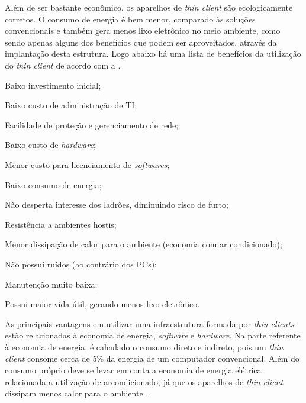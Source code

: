\documentclass[
	12pt,				%
	openright,			%
	twoside,			%
	a4paper,			%
	chapter=TITLE,		%
	english,			%
	brazil				%
	]{abntex2}
\begin{document}
Além de ser bastante econômico, os aparelhos de \textit{thin client} são ecologicamente corretos. O consumo de energia é bem menor, comparado às soluções convencionais e também gera menos lixo eletrônico no meio ambiente, como sendo apenas alguns dos benefícios que podem ser aproveitados, através da implantação desta estrutura. Logo abaixo há uma lista de benefícios da utilização do \textit{thin client} de acordo com a .

\begin{alineas}
\item Baixo investimento inicial;
\item Baixo custo de administração de TI;
\item Facilidade de proteção e gerenciamento de rede;
\item Baixo custo de \textit{hardware};
\item Menor custo para licenciamento de \textit{softwares};
\item Baixo consumo de energia;
\item Não desperta interesse dos ladrões, diminuindo risco de furto;
\item Resistência a ambientes hostis;
\item Menor dissipação de calor para o ambiente (economia com ar condicionado);
\item Não possui ruídos (ao contrário dos PCs);
\item Manutenção muito baixa;
\item Possui maior vida útil, gerando menos lixo eletrônico.
\end{alineas}

As principais vantagens em utilizar uma infraestrutura formada por \textit{thin clients} estão relacionadas à economia de energia, \textit{software} e \textit{hardware}. Na parte referente à economia de energia, é calculado o consumo direto e indireto, pois um \textit{thin client} consome cerca de 5\% da energia de um computador convencional. Além do consumo próprio deve se levar em conta a economia de energia elétrica relacionada a utilização de ar\-condicionado, já que os aparelhos de \textit{thin client} dissipam menos calor para o ambiente \cite{EmailThinClient}.
	 

\begin{table}[h!]
\end{table}
\end{document}
